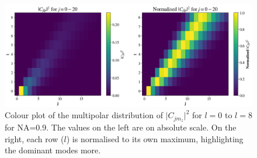 \begin{figure}
    \includegraphics[width=0.9\linewidth]{Figures/C_NA09.png}
    \caption{Colour plot of the multipolar distribution of \( \lvert C_{jm_z} \rvert^2 \) for \( l=0 \) to \( l=8 \) for NA=0.9. The values on the left are on absolute scale. On the right, each row (\( l \)) is normalised to its own maximum, highlighting the dominant modes more.}
    \label{fig:Cj_NA09}
\end{figure}